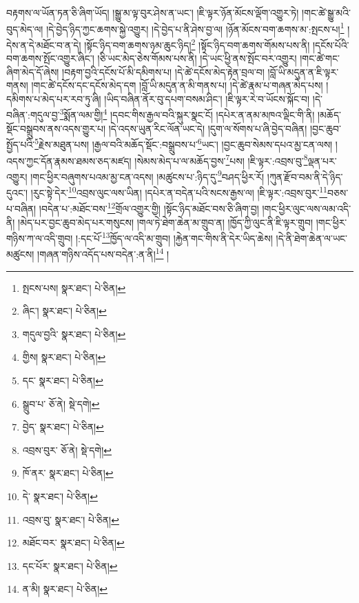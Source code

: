 བརྟགས་ལ་ཡོན་ཏན་ཅི་ཞིག་ཡོད། །སྒྱུ་མ་ལྟ་བུར་ཤེས་ན་ཡང་། །ཇི་ལྟར་ཉོན་མོངས་ལྡོག་འགྱུར་ཏེ། །གང་ཚེ་སྒྱུ་མའི་བུད་མེད་ལ། །དེ་བྱེད་ཉིད་ཀྱང་ཆགས་སྐྱེ་འགྱུར། །དེ་བྱེད་པ་ནི་ཤེས་བྱ་ལ། །ཉོན་མོངས་བག་ཆགས་མ་:སྤངས་པ།\footnote{སྤངས་པས།  སྣར་ཐང་།  པེ་ཅིན། } །དེས་ན་དེ་མཐོང་བ་ན་དེ། །སྟོང་ཉིད་བག་ཆགས་ཉམ་ཆུང་ཉིད།\footnote{ཞིང་།  སྣར་ཐང་།  པེ་ཅིན། } །སྟོང་ཉིད་བག་ཆགས་གོམས་པས་ནི། །དངོས་པོའི་བག་ཆགས་སྤོང་འགྱུར་ཞིང་། །ཅི་ཡང་མེད་ཅེས་གོམས་པས་ནི། །དེ་ཡང་ཕྱི་ནས་སྤོང་བར་འགྱུར། །གང་ཚེ་གང་ཞིག་མེད་དོ་ཞེས། །བརྟག་བྱའི་དངོས་པོ་མི་དམིགས་པ། །དེ་ཚེ་དངོས་མེད་རྟེན་བྲལ་བ། །བློ་ཡི་མདུན་ན་ཇི་ལྟར་གནས། །གང་ཚེ་དངོས་དང་དངོས་མེད་དག །བློ་ཡི་མདུན་ན་མི་གནས་པ། །དེ་ཚེ་རྣམ་པ་གཞན་མེད་པས། །དམིགས་པ་མེད་པར་རབ་ཏུ་ཞི། །ཡིད་བཞིན་ནོར་བུ་དཔག་བསམ་ཤིང་། །ཇི་ལྟར་རེ་བ་ཡོངས་སྐོང་བ། །དེ་བཞིན་:གདུལ་བྱ་\footnote{གདུལ་བྱའི་  སྣར་ཐང་།  པེ་ཅིན། }སྨོན་ལམ་གྱི།\footnote{གྱིས།  སྣར་ཐང་།  པེ་ཅིན། } །དབང་གིས་རྒྱལ་བའི་སྐུར་སྣང་ངོ། །དཔེར་ན་ནམ་མཁའ་ལྡིང་གི་ནི། །མཆོད་སྡོང་བསྒྲུབས་ནས་འདས་གྱུར་པ། །དེ་འདས་ཡུན་རིང་ལོན་ཡང་དེ། །དུག་ལ་སོགས་པ་ཞི་བྱེད་བཞིན། །བྱང་ཆུབ་སྤྱོད་པའི་\footnote{དང་  སྣར་ཐང་།  པེ་ཅིན། }རྗེས་མཐུན་པས། །རྒྱལ་བའི་མཆོད་སྡོང་:བསྒྲུབས་པ་\footnote{སྒྲུབ་པ་  ཅོ་ནེ།  སྡེ་དགེ། }ཡང་། །བྱང་ཆུབ་སེམས་དཔའ་མྱ་ངན་ལས། །འདས་ཀྱང་དོན་རྣམས་ཐམས་ཅད་མཛད། །སེམས་མེད་པ་ལ་མཆོད་བྱས་\footnote{བྱེད་  སྣར་ཐང་།  པེ་ཅིན། }པས། །ཇི་ལྟར་:འབྲས་བུ་\footnote{འབྲས་བུར་  ཅོ་ནེ།  སྡེ་དགེ། }ལྡན་པར་འགྱུར། །གང་ཕྱིར་བཞུགས་པའམ་མྱ་ངན་འདས། །མཚུངས་པ་:ཉིད་དུ་\footnote{ཁོ་ནར་  སྣར་ཐང་།  པེ་ཅིན། }བཤད་ཕྱིར་རོ། །ཀུན་རྫོབ་བམ་ནི་དེ་ཉིད་དུའང་། །རུང་སྟེ་དེར་\footnote{དེ་  སྣར་ཐང་།  པེ་ཅིན། }འབྲས་ལུང་ལས་ཡིན། །དཔེར་ན་བདེན་པའི་སངས་རྒྱས་ལ། །ཇི་ལྟར་:འབྲས་བུར་\footnote{འབྲས་བུ་  སྣར་ཐང་།  པེ་ཅིན། }བཅས་པ་བཞིན། །བདེན་པ་:མཐོང་བས་\footnote{མཐོང་བར་  སྣར་ཐང་།  པེ་ཅིན། }གྲོལ་འགྱུར་གྱི། །སྟོང་ཉིད་མཐོང་བས་ཅི་ཞིག་བྱ། །གང་ཕྱིར་ལུང་ལས་ལམ་འདི་ནི། །མེད་པར་བྱང་ཆུབ་མེད་པར་གསུངས། །གལ་ཏེ་ཐེག་ཆེན་མ་གྲུབ་ན། །ཁྱོད་ཀྱི་ལུང་ནི་ཇི་ལྟར་གྲུབ། །གང་ཕྱིར་གཉིས་ཀ་ལ་འདི་གྲུབ། །:དང་པོ་\footnote{དང་པོར་  སྣར་ཐང་།  པེ་ཅིན། }ཁྱོད་ལ་འདི་མ་གྲུབ། །རྐྱེན་གང་གིས་ནི་དེར་ཡིད་ཆེས། །དེ་ནི་ཐེག་ཆེན་ལ་ཡང་མཚུངས། །གཞན་གཉིས་འདོད་པས་བདེན་:ན་ནི།\footnote{ན་མི།  སྣར་ཐང་།  པེ་ཅིན། } །
